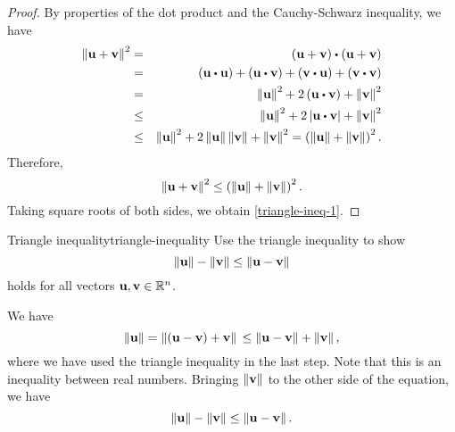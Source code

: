 \begin{proof}
  By properties of the dot product and the Cauchy-Schwarz inequality,
  we have
  \begin{eqnarray*}
    \norm{\vect{u}+\vect{v}}^{2}
    &=& \tup{\vect{u}+\vect{v}}\dotprod\tup{\vect{u}+\vect{v}} \\
    & =&\tup{\vect{u}\dotprod\vect{u}}+\tup{\vect{u}\dotprod\vect{v}}+\tup{\vect{v}\dotprod\vect{u}}+\tup{\vect{v}\dotprod\vect{v}} \\
    &=&\norm{\vect{u}}^{2}+2\tup{\vect{u}\dotprod\vect{v}}+\norm{\vect{v}}^{2} \\
    &\leq& \norm{\vect{u}}^{2}+2\abs{\vect{u}\dotprod\vect{v}}+\norm{\vect{v}}^{2} \\
    &\leq& \norm{\vect{u}}^{2}+2\norm{\vect{u}}\norm{\vect{v}}+\norm{\vect{v}}^{2} =\tup{\norm{\vect{u}}+\norm{\vect{v}}}^{2}.
  \end{eqnarray*}
  Therefore,
  \begin{equation*}
    \left\|\mbox{\bf u}+\mbox{\bf v}\right\|^{2}\leq\left(\left\|\mbox{\bf u}\right\|+\left\|\mbox{\bf v}\right\|\right)^{2}.
  \end{equation*}
  Taking square roots of both sides, we obtain \eqref{triangle-ineq-1}.
\end{proof}

\begin{example}{Triangle inequality}{triangle-inequality}
  Use the triangle inequality to show
  \begin{equation*}
    \left\|\mbox{\bf u}\right\| -\left\|\mbox{\bf v}\right\| \leq \left\|\mbox{\bf u}-\mbox{\bf v}\right\|
  \end{equation*}
  holds for all vectors $\mbox{\bf u},\mbox{\bf v}\in\mathbb{R}^n$.
\end{example}

\begin{solution}
  We have
  \begin{equation*}
    \left\|\mbox{\bf u}\right\|
    = \left\|(\mbox{\bf u}-\mbox{\bf v})+\mbox{\bf v}\right\| \\
    \leq \left\|\mbox{\bf u}-\mbox{\bf v}\right\|+\left\|\mbox{\bf v}\right\|,
  \end{equation*}
  where we have used the triangle inequality in the last step. Note
  that this is an inequality between real numbers. Bringing
  $\left\|\mbox{\bf v}\right\|$ to the other side of the equation, we have
  \begin{equation*}
    \left\|\mbox{\bf u}\right\| - \left\|\mbox{\bf v}\right\| \leq \left\|\mbox{\bf u}-\mbox{\bf v}\right\|.
  \end{equation*}
\end{solution}
